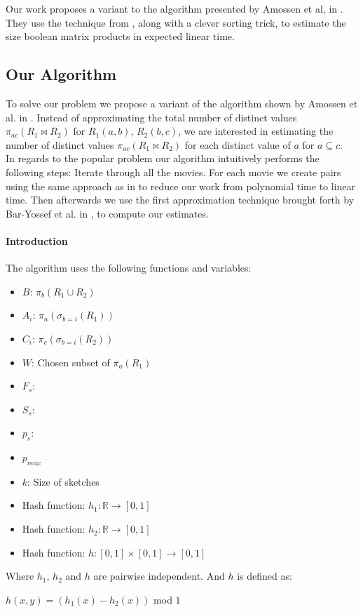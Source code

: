 \documentclass[a4paper,11pt]{article}
\begin{document}
Our work proposes a variant to the algorithm presented by Amossen et al, in \cite{paper:amossen}. They use the technique from \cite{paper:bar-yos}, along with a clever sorting trick, to estimate the size boolean matrix products in expected linear time.

\subsection{Our Algorithm}
\label{subsub:alg}
To solve our problem we propose a variant of the algorithm shown by Amossen et al. in \cite{paper:Amossen}. Instead of approximating the total number of distinct values $\pi_{ac}(R_1 \Join R_2)$ for $R_1(a,b)$, $R_2(b,c)$, we are interested in estimating the number of distinct values $\pi_{ac}(R_1 \Join R_2)$ for each distinct value of $a$ for $a \subseteq c$.\\ %
In regards to the popular problem our algorithm intuitively performs the following steps: Iterate through all the movies. For each movie we create pairs using the same approach as in \cite{paper:Amossen} to reduce our work from polynomial time to linear time. Then afterwards we use the first approximation technique brought forth by Bar-Yossef et al. in \cite{paper:Bar-Yossef}, to compute our estimates.

\paragraph{Introduction}
The algorithm uses the following functions and variables:

\begin{itemize}
  \item $B$: $\pi_{b}(R_1 \cup R_2)$
  \item $A_i$: $\pi_{a}(\sigma_{b=i}(R_1))$
  \item $C_i$: $\pi_{c}(\sigma_{b=i}(R_2))$
  \item $W$: Chosen subset of $\pi_{a}(R_1)$
  \item $F_s$:
  \item $S_s$:
  \item $p_s$:
  \item $p_{max}$
  \item $k$: Size of sketches
  \item Hash function: $h_1 : \mathbb{R} \rightarrow [0,1]$
  \item Hash function: $h_2 : \mathbb{R} \rightarrow [0,1]$
  \item Hash function: $h : [0,1] \times [0,1] \rightarrow [0,1]$
\end{itemize}
Where $h_1$, $h_2$ and $h$ are pairwise independent. And $h$ is defined as:
\begin{center}
$h(x,y) = (h_1(x) - h_2(x))$ mod $1$
\end{center}
\end{document}
